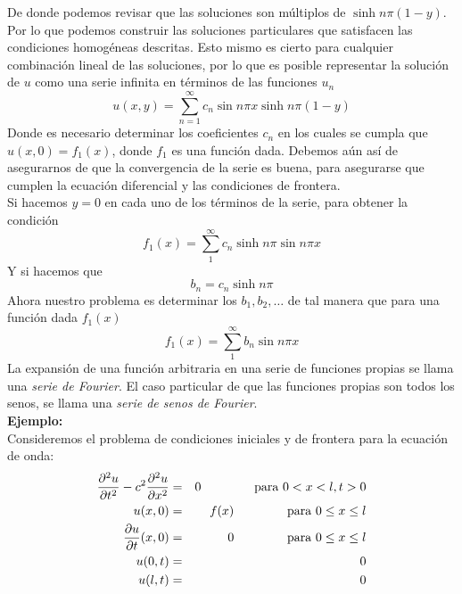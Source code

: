 De donde podemos revisar que las soluciones son múltiplos de $\sinh n \pi (1-y)$. Por lo que podemos construir las soluciones particulares que satisfacen las condiciones homogéneas descritas. Esto mismo es cierto para cualquier combinación lineal de las soluciones, por lo que es posible representar la solución de $u$ como una serie infinita en términos de las funciones $u_{n}$
\begin{equation}
u(x,y) =  \sum_{n=1}^{\infty} c_{n} \sin n \pi x \sinh n \pi (1-y)
\end{equation}
Donde es necesario determinar los coeficientes $c_{n}$ en los cuales se cumpla que $u(x,0) = f_{1}(x)$, donde $f_{1}$ es una función dada. Debemos aún así de asegurarnos de que la convergencia de la serie es buena, para asegurarse que cumplen la ecuación diferencial y las condiciones de frontera.
\\
Si hacemos $y=0$ en cada uno de los términos de la serie, para obtener la condición
\begin{equation}
f_{1}(x) = \sum^{\infty}_{1} c_{n} \sinh n \pi \sin n \pi x
\end{equation}
Y si hacemos que
\begin{equation}
b_{n} = c_{n} \sinh n \pi
\end{equation}
Ahora nuestro problema es determinar los $b_{1}, b_{2}, \ldots$  de tal manera que para una función dada $f_{1}(x)$
\begin{equation}
f_{1}(x) = \sum_{1}^{\infty} b_{n} \sin n \pi  x
\end{equation}
La expansión de una función arbitraria en una serie de funciones propias se llama una \emph{serie de Fourier}. El caso particular de que las funciones propias son todos los senos, se llama una \emph{serie de senos de Fourier}.
\\
\textbf{Ejemplo:}
\\
Consideremos el problema de condiciones iniciales y de frontera para la ecuación de onda:
\begin{eqnarray*}
\dfrac{\partial^2 u}{\partial t^{2}} - c^{2} \dfrac{\partial^{2} u}{\partial x^{2}} &=& 0 \hspace{1.5 cm} \text{para } 0 < x < l, t > 0 \\
u(x,0) &=& f(x) \hspace{1.5cm} \text{para } 0 \leq x \leq l \\
\dfrac{\partial u}{\partial t} (x,0) &=& 0 \hspace{1.5cm} \text{para } 0 \leq x \leq l \\
u(0,t) &=& 0 \\
u(l,t) &=& 0
\end{eqnarray*}
